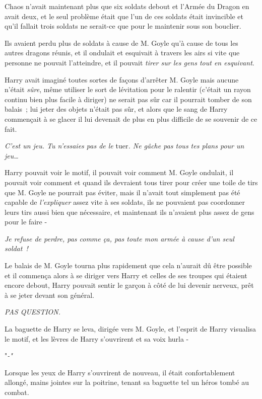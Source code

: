 Chaos n'avait maintenant plus que six soldats debout et l'Armée du Dragon en avait deux, et le seul problème était que l'un de ces soldats était invincible et qu'il fallait trois soldats ne serait-ce que pour le maintenir sous son bouclier.

Ils avaient perdu plus de soldats à cause de M. Goyle qu'à cause de tous les autres dragons réunis, et il ondulait et esquivait à travers les airs si vite que personne ne pouvait l'atteindre, et il pouvait \emph{tirer sur les gens tout en esquivant}.

Harry avait imaginé toutes sortes de façons d'arrêter M. Goyle mais aucune n'était \emph{sûre}, même utiliser le sort de lévitation pour le ralentir (c'était un rayon continu bien plus facile à diriger) ne serait pas sûr car il pourrait tomber de son balais~; lui jeter des objets n'était pas sûr, et alors que le sang de Harry commençait à se glacer il lui devenait de plus en plus difficile de se souvenir de ce fait.

\emph{C'est un jeu. Tu n'essaies pas de le} tuer\emph{. Ne gâche pas tous tes plans pour un jeu…}

Harry pouvait voir le motif, il pouvait voir comment M. Goyle ondulait, il pouvait voir comment et quand ils devraient tous tirer pour créer une toile de tirs que M. Goyle ne pourrait pas éviter, mais il n'avait tout simplement pas été capable de \emph{l'expliquer} assez vite à ses soldats, ils ne pouvaient pas coordonner leurs tirs aussi bien que nécessaire, et maintenant ils n'avaient plus assez de gens pour le faire -

\emph{Je refuse de perdre, pas comme ça, pas toute mon armée à cause d'un seul soldat~!}

Le balais de M. Goyle tourna plus rapidement que cela n'aurait dû être possible et il commença alors à se diriger vers Harry et celles de ses troupes qui étaient encore debout, Harry pouvait sentir le garçon à côté de lui devenir nerveux, prêt à se jeter devant son général.

\emph{PAS QUESTION.}

La baguette de Harry se leva, dirigée vers M. Goyle, et l'esprit de Harry visualisa le motif, et les lèvres de Harry s'ouvrirent et sa voix hurla -

"\emph{-"}

\later

Lorsque les yeux de Harry s'ouvrirent de nouveau, il était confortablement allongé, mains jointes sur la poitrine, tenant sa baguette tel un héros tombé au combat.

